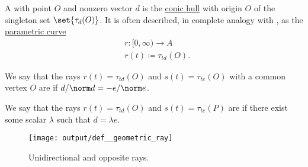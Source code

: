 \begin{definition}\label{def:geometric_ray}\mimprovised
  A  with  point \( O \) and nonzero  vector \( d \) is the \hyperref[def:conic_hull]{conic hull} with origin \( O \) of the singleton set \( \set{ \tau_d(O) } \). It is often described, in complete analogy with , as the \hyperref[def:parametric_curve]{parametric curve}
  \begin{equation*}
    \begin{aligned}
       &r: [0, \infty) \to A \\
       &r(t) \coloneqq \tau_{td}(O).
    \end{aligned}
  \end{equation*}

  \begin{thmenum}
     We say that the rays \( r(t) = \tau_{t d}(O) \) and \( s(t) = \tau_{t e}(O) \) with a common vertex \( O \) are  if \( d / \norm d = -e / \norm e \).

     We say that the rays \( r(t) = \tau_{t d}(O) \) and \( s(t) = \tau_{t e}(P) \) are  if there exist some  scalar \( \lambda \) such that \( d = \lambda e \).
  \end{thmenum}

  \begin{figure}[!ht]
    \centering
    \texttt{[image: output/def\_\_geometric\_ray]}
    \caption{Unidirectional and opposite rays.}\label{fig:def:geometric_ray}
  \end{figure}
\end{definition}

